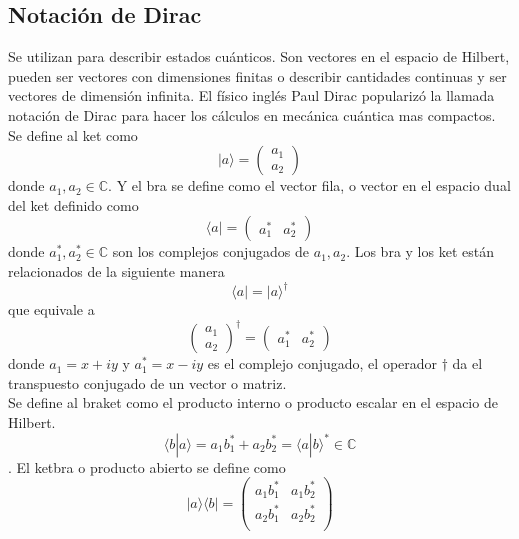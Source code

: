 \documentclass[a4paper]{article}
\begin{document}
\subsection{Notación de Dirac}
Se utilizan para describir estados cuánticos. Son vectores en el espacio de Hilbert, pueden ser vectores con dimensiones finitas o describir cantidades continuas y ser vectores de dimensión infinita. El físico inglés Paul Dirac popularizó la llamada notación de Dirac para hacer los cálculos en mecánica cuántica mas compactos.
Se define al ket como
\begin{equation}
|a\rangle=
	\begin{pmatrix}
		a_1\\
		a_2
	\end{pmatrix}
\end{equation}
donde $a_1, a_2 \in \mathbb{C} $. Y el bra se define como el vector fila, o vector en el espacio dual del ket definido como 
\begin{equation}
\langle a|=
	\begin{pmatrix}
		a_1^*&a_2^*
	\end{pmatrix}
\end{equation}
donde $a_1^*, a_2^* \in \mathbb{C} $ son los complejos conjugados de $a_1, a_2$.
Los bra y los ket están relacionados de la siguiente manera
\begin{equation}
\langle a|=|a\rangle^\dagger
\end{equation}
que equivale a 
\begin{equation}
\begin{pmatrix}
		a_1\\
		a_2
	\end{pmatrix}^\dagger=
	\begin{pmatrix}
		a_1^*&a_2^*
	\end{pmatrix}
\end{equation}
donde $a_1=x+iy$ y $a_1^*=x-iy$ es el complejo conjugado, el operador $\dagger$ da el transpuesto conjugado de un vector o matriz.\\
Se define al braket como el producto interno o producto escalar en el espacio de Hilbert.
\begin{equation}
\langle b | a\rangle=a_1b_1^*+a_2b_2^*=\langle a | b\rangle^*\in \mathbb{C}
\end{equation}.
El ketbra o producto abierto se define como 
\begin{equation}
|a\rangle\langle b|=
	\begin{pmatrix}
		a_1 b_1^*& a_1 b_2^*\\
		a_2 b_1^*& a_2 b_2^*\\
	\end{pmatrix}
\end{equation}
\end{document}
